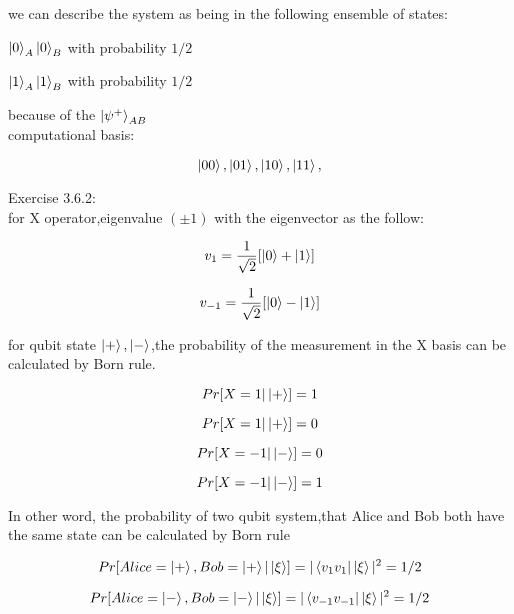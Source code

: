 \documentclass[xelatex,ja=standard,jafont=noto]{bxjsarticle}
\begin{document}
we can describe the system as being in the following
ensemble of states:


    $\ket{0}_{A}\ket{0}_{B}$ with probability $1/2$
    
    $\ket{1}_{A}\ket{1}_{B}$ with probability $1/2$
    
    
because of the $\ket{\psi^{+}}_{AB}$\\

computational basis:

\begin{equation}
    \ket{00},\ket{01},\ket{10},\ket{11},
\end{equation}


Exercise 3.6.2:\\


for X operator,eigenvalue $(\pm1)$ with the eigenvector as the follow:

\begin{equation}
    v_{1}=\frac{1}{\sqrt{2}}[\ket{0}+\ket{1}]
\end{equation}

\begin{equation}
    v_{-1}=\frac{1}{\sqrt{2}}[\ket{0}-\ket{1}]
\end{equation}


for qubit state $\ket{+},\ket{-}$,the probability of the measurement in the X basis can be calculated by Born rule.

\begin{equation}
    Pr[X=1|\ket{+}]=1
\end{equation}

\begin{equation}
    Pr[X=1|\ket{+}]=0
\end{equation}

\begin{equation}
    Pr[X=-1|\ket{-}]=0
\end{equation}

\begin{equation}
    Pr[X=-1|\ket{-}]=1
\end{equation}


In other word, the probability of two qubit system,that Alice and Bob both have the same state can be calculated by Born rule

\begin{equation}
    Pr[Alice=\ket{+},Bob=\ket{+}|\ket{\xi}]=|\bra{v_{1}v_{1}}\ket{\xi}|^{2}=1/2
\end{equation}

\begin{equation}
    Pr[Alice=\ket{-},Bob=\ket{-}|\ket{\xi}]=|\bra{v_{-1}v_{-1}}\ket{\xi}|^{2}=1/2
\end{equation}
\end{document}
